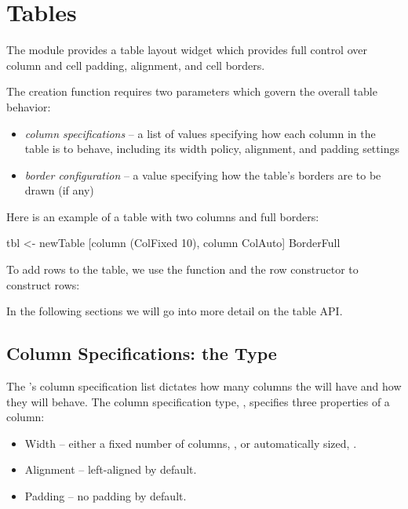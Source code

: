 \section{Tables}

The  module provides a table layout widget which provides
full control over column and cell padding, alignment, and cell
borders.

The  creation function  requires two parameters
which govern the overall table behavior:

\begin{itemize}
\item \textit{column specifications} -- a list of values specifying
  how each column in the table is to behave, including its width
  policy, alignment, and padding settings
\item \textit{border configuration} -- a value specifying how the
  table's borders are to be drawn (if any)
\end{itemize}

Here is an example of a table with two columns and full borders:

\begin{haskellcode}
 tbl <- newTable [column (ColFixed 10), column ColAuto] BorderFull
\end{haskellcode}

To add rows to the table, we use the  function and the row
constructor  to construct rows:


In the following sections we will go into more detail on the table
API.

\subsection{Column Specifications: the  Type}
\label{sec:columnspecs}

The 's column specification list dictates how many
columns the  will have and how they will behave.  The column
specification type, , specifies three properties of a
column:

\begin{itemize}
\item Width -- either a fixed number of columns, , or
  automatically sized, .
\item Alignment -- left-aligned by default.
\item Padding -- no padding by default.
\end{itemize}

